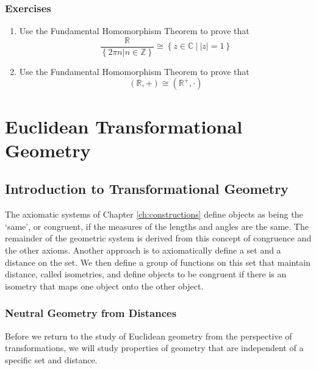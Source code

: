 \documentclass[
]{book}
\theoremstyle{definition}
\theoremstyle{definition}
\theoremstyle{definition}
\theoremstyle{definition}
\theoremstyle{remark}
\begin{document}
\hypertarget{exercises-49}{%
\subsection{Exercises}\label{exercises-49}}

\begin{enumerate}
\def\labelenumi{\arabic{enumi}.}
\item
  Use the Fundamental Homomorphism Theorem to prove that
  \[\frac{\mathbb{R}}{ \left\{2\pi n | n \in \mathbb{Z}\right\} } \cong \left\{ z \in \mathbb{C} \: | \: |z|=1 \right\}\]
\item
  Use the Fundamental Homomorphism Theorem to prove that \[(\mathbb{R},+) \cong (\mathbb{R}^+,\cdot)\]
\end{enumerate}

\hypertarget{ch:transformations}{%
\chapter{Euclidean Transformational Geometry}\label{ch:transformations}}

\hypertarget{introduction-to-transformational-geometry}{%
\section{Introduction to Transformational Geometry}\label{introduction-to-transformational-geometry}}

The axiomatic systems of Chapter \ref{ch:constructions} define objects as being the `same', or congruent, if the measures of the lengths and angles are the same. The remainder of the geometric system is derived from this concept of congruence and the other axioms. Another approach is to axiomatically define a set and a distance on the set. We then define a group of functions on this set that maintain distance, called isometries, and define objects to be congruent if there is an isometry that maps one object onto the other object.

\hypertarget{neutral-geometry-from-distances}{%
\subsection{Neutral Geometry from Distances}\label{neutral-geometry-from-distances}}

Before we return to the study of Euclidean geometry from the perspective of transformations, we will study properties of geometry that are independent of a specific set and distance.
\end{document}
